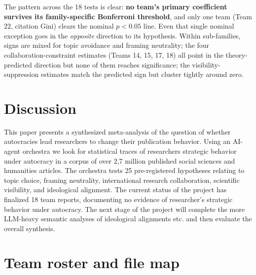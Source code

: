 \documentclass[12pt,a4paper]{article}
\newcommand{\todo}[1]{\textcolor{red}{[TODO: #1]}}
\begin{document}
The pattern across the 18 tests is clear: \textbf{no team's primary
coefficient survives its family-specific Bonferroni threshold}, and only
one team (Team 22, citation Gini) clears the nominal $p<0.05$ line. Even
that single nominal exception goes in the \emph{opposite} direction to
its hypothesis. Within sub-families, signs are mixed for topic avoidance
and framing neutrality; the four collaboration-constraint estimates
(Teams 14, 15, 17, 18) all point in the theory-predicted direction but
none of them reaches significance; the visibility-suppression estimates
match the predicted sign but cluster tightly around zero.


\section{Discussion}
\label{sec:discussion}
This paper presents a synthesized meta-analysis of the question of whether autocracies lead researchers to change their publication behavior. Using an AI-agent orchestra we look for statistical traces of researchers strategic behavior under autocracy in a corpus of over 2,7 million published social sciences and humanities articles. The orchestra tests 25 pre-registered hypotheses relating to topic choice, framing neutrality, international research collaboration, scientific visibility, and ideological alignment. The current status of the project has finalized 18 team reports, documenting no evidence of researcher's strategic behavior under autocracy. The next stage of the project will complete the more LLM-heavy semantic analyses of ideological alignments etc. and then evaluate the overall synthesis. 
\clearpage



\appendix

\section{Team roster and file map}
\label{app:teams}
\end{document}
